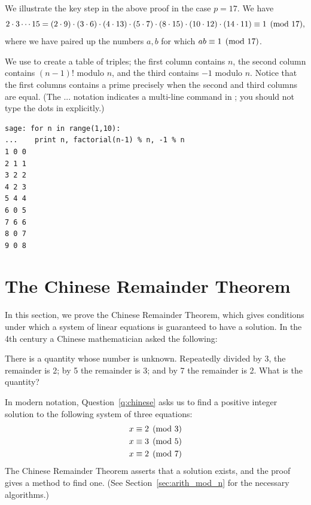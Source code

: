 \begin{example}
We illustrate the key step in the above proof in the case $p=17$.
We have
$$
2\cdot 3 \cdots  15
  = (2\cdot 9)\cdot(3\cdot 6)\cdot(4\cdot 13)\cdot
    (5\cdot 7)\cdot(8\cdot 15)\cdot(10\cdot 12)\cdot(14\cdot 11)
  \equiv 1\pmod{17},$$
where we have paired up the numbers $a, b$ for
which $ab\equiv 1\pmod{17}$.
\end{example}

\begin{sg}
  We use \sage to create a table of triples; the first column contains
  $n$, the second column contains $(n-1)!$ modulo $n$, and the third
  contains $-1$ modulo $n$.  Notice that the first columns contains a
  prime precisely when the second and third columns are equal.  (The
  ... notation indicates a multi-line command in \sage; you should not
  type the dots in explicitly.)
\begin{verbatim}
sage: for n in range(1,10):
...    print n, factorial(n-1) % n, -1 % n
1 0 0
2 1 1
3 2 2
4 2 3
5 4 4
6 0 5
7 6 6
8 0 7
9 0 8
\end{verbatim}
\end{sg}

\section{The Chinese Remainder Theorem}\label{sec:chinese}%
In this section, we prove the Chinese Remainder Theorem, which gives
conditions under which a system of linear equations is guaranteed to
have a solution.
In the 4th century a Chinese mathematician asked the following:
\begin{question}\label{q:chinese}
There is a quantity whose number is unknown. Repeatedly divided
by 3, the remainder is 2; by 5 the remainder is 3; and by 7 the
remainder is 2. What is the quantity?
\end{question}
In modern notation, Question~\ref{q:chinese}  asks us to
find a positive integer solution to the following system of
three equations:
\begin{align*}
x &\equiv 2 \pmod{3}\\
x &\equiv 3 \pmod{5}\\
x &\equiv 2 \pmod{7}
\end{align*}
The Chinese Remainder Theorem asserts that a solution
exists, and the proof gives a method to find one.
(See Section~\ref{sec:arith_mod_n} for the necessary algorithms.)


